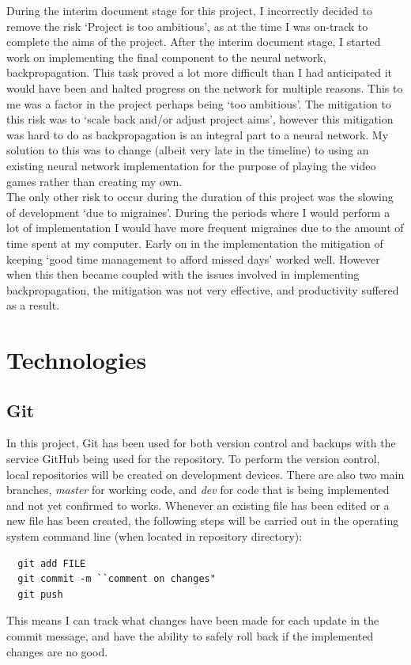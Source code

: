 \documentclass[10pt]{article}
\begin{document}
	During the interim document stage for this project, I incorrectly decided to remove the risk `Project is too ambitious', as at the time I was on-track to complete the aims of the project. After the interim document stage, I started work on implementing the final component to the neural network, backpropagation. This task proved a lot more difficult than I had anticipated it would have been and halted progress on the network for multiple reasons. This to me was a factor in the project perhaps being `too ambitious'. The mitigation to this risk was to `scale back and/or adjust project aims', however this mitigation was hard to do as backpropagation is an integral part to a neural network. My solution to this was to change (albeit very late in the timeline) to using an existing neural network implementation for the purpose of playing the video games rather than creating my own.\\
	
	The only other risk to occur during the duration of this project was the slowing of development `due to migraines'. During the periods where I would perform a lot of implementation I would have more frequent migraines due to the amount of time spent at my computer. Early on in the implementation the mitigation of keeping `good time management to afford missed days' worked well. However when this then became coupled with the issues involved in implementing backpropagation, the mitigation was not very effective, and productivity suffered as a result.
	
	\bigskip
\section{Technologies}
	
	\subsection{Git}
		In this project, Git has been used for both version control and backups with the service GitHub being used for the repository. To perform the version control, local repositories will be created on development devices. There are also two main branches, \textit{master} for working code, and \textit{dev} for code that is being implemented and not yet confirmed to works. Whenever an existing file has been edited or a new file has been created, the following steps will be carried out in the operating system command line (when located in repository directory):
		\begin{lstlisting}
  git add FILE
  git commit -m ``comment on changes"
  git push
		\end{lstlisting}
		This means I can track what changes have been made for each update in the commit message, and have the ability to safely roll back if the implemented changes are no good.
		
\end{document}

